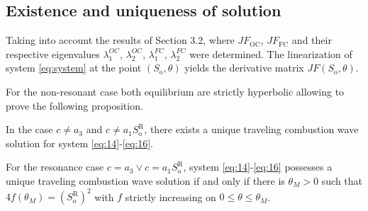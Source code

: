 

\subsection{Existence and uniqueness of solution}

Taking into account the results of Section 3.2, where $JF_{\text{OC}}$,
$JF_{\text{FC}}$ and their respective eigenvalues $\lambda^{OC}_{1}$, $\lambda^{OC}_{2}$, $\lambda^{FC}_{1}$, $\lambda^{FC}_{2}$ were determined.
The linearization of system \eqref{eq:system} at the point $\left(S_{\text{o}},\theta\right)$ yields the derivative matrix  $JF\left(S_{\text{o}},\theta\right)$.

For the non-resonant case both equilibrium are strictly hyperbolic
allowing to prove the following proposition.

\begin{proposition}
	In the case $c\neq a_{3}$ and $c\neq a_{1}S_{\text{o}}^{\text{R}}$,
	there exists a unique traveling combustion wave solution for system
	\eqref{eq:14}-\eqref{eq:16}.
\end{proposition}

\begin{proposition}
	For the resonance case $c=a_{3}\vee c=a_{1}S_{\text{o}}^{\text{R}}$,
	system \eqref{eq:14}-\eqref{eq:16} possesses a unique traveling combustion wave
	solution if and only if there is $\theta_{M}>0$ such that
	$4f\left(\theta_{M}\right)=\left(S_{\text{o}}^{\text{R}}\right)^2$
	with $f$ strictly increasing on $0\leq\theta\leq\theta_{M}$.
\end{proposition}

